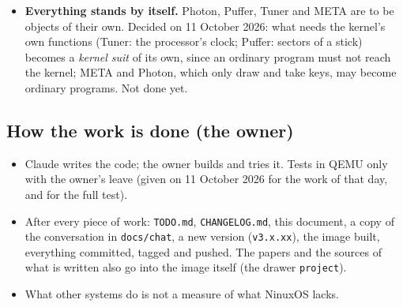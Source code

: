 \documentclass[11pt,a4paper]{article}
\newcommand{\file}[1]{\texttt{#1}}
\begin{document}
\begin{itemize}
      share of its disk to a common pool, on which NET and META live and one intelligence may
      serve everyone. Proposed: a pin is the print of a machine's key, found through a table
      spread over the machines; data lie in blocks named by their SHA-256, kept several
      times in a reserved part of each disk; work is cut into pieces sent as parcels, each
      done by two machines and compared. It fits work that can wait (baking the photon maps),
      not a frame of a game across the internet. What each gives is measured as a pair,
      power for space: space given earns processor time and the other way. Content lives in
      the caches of those who saw it, with a seed machine and a threshold under which the
      system seeds it elsewhere. Not begun.
\item \textbf{Everything stands by itself.} Photon, Puffer, Tuner and META are to be objects
      of their own. Decided on 11 October 2026: what needs the kernel's own functions (Tuner:
      the processor's clock; Puffer: sectors of a stick) becomes a \emph{kernel suit} of its
      own, since an ordinary program must not reach the kernel; META and Photon, which only
      draw and take keys, may become ordinary programs. Not done yet.
\end{itemize}

\subsection{How the work is done (the owner)}
\begin{itemize}
\item Claude writes the code; the owner builds and tries it. Tests in QEMU only with the
      owner's leave (given on 11 October 2026 for the work of that day, and for the full test).
\item After every piece of work: \file{TODO.md}, \file{CHANGELOG.md}, this document, a copy of
      the conversation in \file{docs/chat}, a new version (\texttt{v3.x.xx}), the image built,
      everything committed, tagged and pushed. The papers and the sources of what is written
      also go into the image itself (the drawer \texttt{project}).
\item What other systems do is not a measure of what NinuxOS lacks.
\end{itemize}
\end{document}
